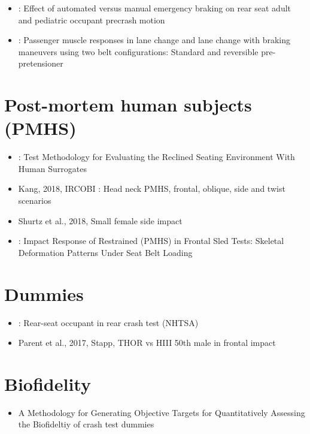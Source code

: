 \documentclass[]{book}
\providecommand{\tightlist}{%
  \setlength{\itemsep}{0pt}\setlength{\parskip}{0pt}}
\begin{document}
\begin{itemize}
\item
  \citet{Graci2019}: Effect of automated versus manual emergency braking on rear seat adult and pediatric occupant precrash motion
\item
  \citet{Ghaffari2019}: Passenger muscle responses in lane change and lane change with braking maneuvers using two belt configurations: Standard and reversible pre-pretensioner
\end{itemize}

\hypertarget{post-mortem-human-subjects-pmhs}{%
\section{Post-mortem human subjects (PMHS)}\label{post-mortem-human-subjects-pmhs}}

\begin{itemize}
\item
  \citet{Richardson2019} : Test Methodology for Evaluating the Reclined Seating Environment With Human Surrogates
\item
  Kang, 2018, IRCOBI : Head neck PMHS, frontal, oblique, side and twist scenarios
\item
  Shurtz et al., 2018, Small female side impact
\item
  \citet{Shaw2009} : Impact Response of Restrained (PMHS) in Frontal Sled Tests: Skeletal Deformation Patterns Under Seat Belt Loading
\end{itemize}

\hypertarget{dummies}{%
\section{Dummies}\label{dummies}}

\begin{itemize}
\item
  \citep{Viano2018}: Rear-seat occupant in rear crash test (NHTSA)
\item
  Parent et al., 2017, Stapp, THOR vs HIII 50th male in frontal impact
\end{itemize}

\hypertarget{biofidelity}{%
\section{Biofidelity}\label{biofidelity}}

\begin{itemize}
\tightlist
\item
  A Methodology for Generating Objective Targets for Quantitatively Assessing the Biofideltiy of crash test dummies \citep{Rhule2009}
\end{itemize}
\end{document}
